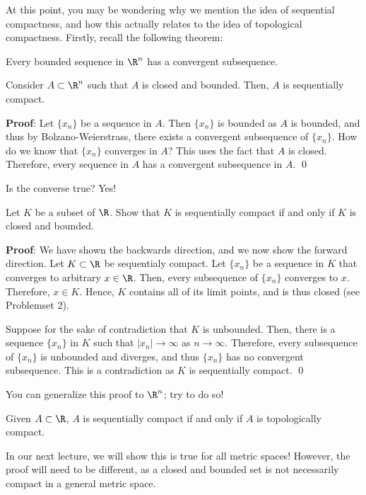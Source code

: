 At this point, you may be wondering why we mention the idea of sequential compactness, and how this actually relates to the idea of topological compactness. Firstly, recall the following theorem:
\begin{theorem}
Every bounded sequence in $\R^n$ has a convergent subsequence.
\end{theorem}

\begin{lemma}
Consider $A\subset \R^n$ such that $A$ is closed and bounded. Then, $A$ is sequentially compact.
\end{lemma}
\textbf{Proof}: Let $\{x_n\}$ be a sequence in $A$. Then $\{x_n\}$ is bounded as $A$ is bounded, and thus by Bolzano-Weierstrass, there exists a convergent subsequence of $\{x_n\}$. How do we know that $\{x_n\}$ converges in $A$? This uses the fact that $A$ is closed. Therefore, every sequence in $A$ has a convergent subsequence in $A.$ \qed 

Is the converse true? Yes!
\begin{theorem}
Let $K$ be a subset of $\R$. Show that $K$ is sequentially compact if and only if $K$ is closed and bounded.
\end{theorem}
\textbf{Proof}: We have shown the backwards direction, and we now show the forward direction. Let $K\subset \R$ be sequentialy compact. Let $\{x_n\}$ be a sequence in $K$ that converges to arbitrary $x\in \R$. Then, every subsequence of $\{x_n\}$ converges to $x$. Therefore, $x\in K$. Hence, $K$ contains all of its limit points, and is thus closed (see Problemset 2).

Suppose for the sake of contradiction that $K$ is unbounded. Then, there is a sequence $\{x_n\}$ in $K$ such that $|x_n|\to \infty$ as $n\to \infty.$ Therefore, every subsequence of $\{x_n\}$ is unbounded and diverges, and thus $\{x_n\}$ has no convergent subsequence. This is a contradiction as $K$ is sequentially compact. \qed 

\begin{remark}
You can generalize this proof to $\R^n$; try to do so!
\end{remark}

\begin{corollary}
Given $A\subset \R$, $A$ is sequentially compact if and only if $A$ is topologically compact.
\end{corollary}
In our next lecture, we will show this is true for all metric spaces! However, the proof will need to be different, as a closed and bounded set is not necessarily compact in a general metric space.